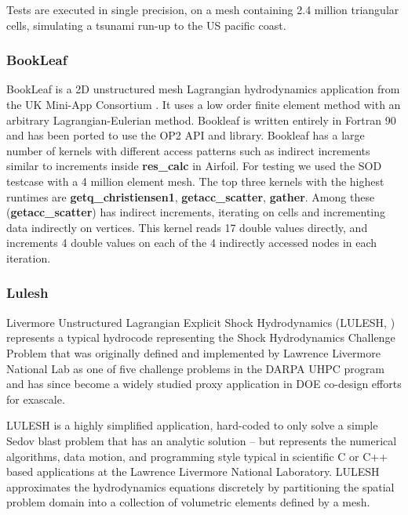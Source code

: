 Tests are executed in single precision, on a mesh containing 2.4 million
triangular cells, simulating a tsunami run-up to the US pacific coast.

\subsubsection{BookLeaf}
BookLeaf is a 2D unstructured mesh Lagrangian hydrodynamics application from the
UK Mini-App Consortium \cite{uk-mac}. It uses a low order finite element method
with an arbitrary Lagrangian-Eulerian method.  Bookleaf is written entirely in
Fortran 90 and has been ported to use the OP2 API and library. Bookleaf has a
large number of kernels with different access patterns such as indirect
increments similar to increments inside \textbf{res\_calc} in Airfoil. For
testing we used the SOD testcase with a 4 million element mesh. The top three
kernels with the highest runtimes are \textbf{getq\_christiensen1},
\textbf{getacc\_scatter}, \textbf{gather}. Among these 
(\textbf{getacc\_scatter}) has indirect increments, iterating on cells and 
incrementing data indirectly on vertices. This kernel reads 17 double values 
directly, and increments 4 double values on each of the 4 indirectly accessed 
nodes in each iteration.

\subsubsection{Lulesh}\label{sec:lulesh-summary}


Livermore Unstructured Lagrangian Explicit Shock Hydrodynamics (LULESH,
\cite{LULESH2:changes}) represents a typical hydrocode representing the Shock
Hydrodynamics Challenge Problem that was originally defined and implemented by
Lawrence Livermore National Lab as one of five challenge problems in the DARPA
UHPC program and has since become a widely studied proxy application in DOE
co-design efforts for exascale. 

LULESH is a highly simplified application, hard-coded to only solve a simple
Sedov blast problem that has an analytic solution \cite{LULESH:spec} – but
represents the numerical algorithms, data motion, and programming style typical
in scientific C or C++ based applications at the Lawrence Livermore National
Laboratory. LULESH approximates the hydrodynamics equations discretely by
partitioning the spatial problem domain into a collection of volumetric elements
defined by a mesh.

